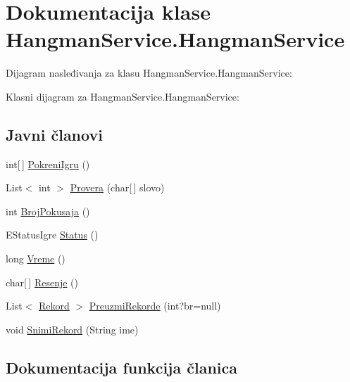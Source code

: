 \hypertarget{classHangmanService_1_1HangmanService}{}\section{Dokumentacija klase Hangman\+Service.\+Hangman\+Service}
\label{classHangmanService_1_1HangmanService}


Dijagram nasleđivanja za klasu Hangman\+Service.\+Hangman\+Service\+:


Klasni dijagram za Hangman\+Service.\+Hangman\+Service\+:
\subsection*{Javni članovi}
\begin{DoxyCompactItemize}
\item 
int\mbox{[}$\,$\mbox{]} \hyperlink{classHangmanService_1_1HangmanService_a566d6e4581bb074a075766acfb2e61f3}{Pokreni\+Igru} ()
\item 
List$<$ int $>$ \hyperlink{classHangmanService_1_1HangmanService_aaa9449e6b94f7f02422c67f29c9bddf0}{Provera} (char\mbox{[}$\,$\mbox{]} slovo)
\item 
int \hyperlink{classHangmanService_1_1HangmanService_aaa469c960be6f1c4888041f2c545fa37}{Broj\+Pokusaja} ()
\item 
E\+Status\+Igre \hyperlink{classHangmanService_1_1HangmanService_a27dd909a6efefaad54609c091e30049b}{Status} ()
\item 
long \hyperlink{classHangmanService_1_1HangmanService_aa3e14358fe242416be99eb901aa1f7be}{Vreme} ()
\item 
char\mbox{[}$\,$\mbox{]} \hyperlink{classHangmanService_1_1HangmanService_a80cbf279f89d6a947b896ac362ac7e98}{Resenje} ()
\item 
List$<$ \hyperlink{classHangman_1_1Rekord}{Rekord} $>$ \hyperlink{classHangmanService_1_1HangmanService_a8ace42822c4d95d22e7adc7452b39baa}{Preuzmi\+Rekorde} (int?br=null)
\item 
void \hyperlink{classHangmanService_1_1HangmanService_a18a21a7d8bf98162cb4b827490b92781}{Snimi\+Rekord} (String ime)
\end{DoxyCompactItemize}


\subsection{Dokumentacija funkcija članica}
\hypertarget{classHangmanService_1_1HangmanService_aaa469c960be6f1c4888041f2c545fa37}{}
